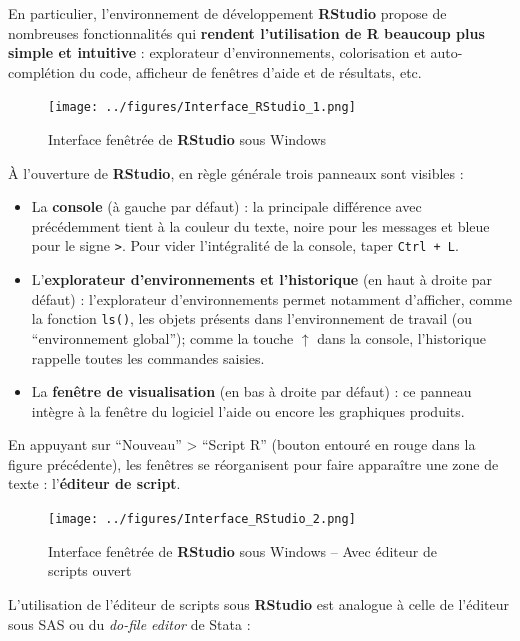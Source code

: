 \documentclass[12pt,twosided, notitlepage]{book}
\providecommand{\tightlist}{%
  \setlength{\itemsep}{0pt}\setlength{\parskip}{0pt}}
\begin{document}
En particulier, l'environnement de développement \textbf{RStudio}
propose de nombreuses fonctionnalités qui \textbf{rendent l'utilisation
de R beaucoup plus simple et intuitive} : explorateur d'environnements,
colorisation et auto-complétion du code, afficheur de fenêtres d'aide et
de résultats, etc.

\begin{figure}
\centering
\texttt{[image: ../figures/Interface\_RStudio\_1.png]}
\caption{Interface fenêtrée de \textbf{RStudio} sous Windows}
\end{figure}

À l'ouverture de \textbf{RStudio}, en règle générale trois panneaux sont
visibles :

\begin{itemize}
\tightlist
\item
  La \textbf{console} (à gauche par défaut) : la principale différence
  avec précédemment tient à la couleur du texte, noire pour les messages
  et bleue pour le signe \texttt{\textgreater{}}. Pour vider
  l'intégralité de la console, taper \texttt{Ctrl\ +\ L}.
\item
  L'\textbf{explorateur d'environnements et l'historique} (en haut à
  droite par défaut) : l'explorateur d'environnements permet notamment
  d'afficher, comme la fonction \texttt{ls()}, les objets présents dans
  l'environnement de travail (ou \enquote{environnement global}); comme
  la touche \(\uparrow\) dans la console, l'historique rappelle toutes
  les commandes saisies.
\item
  La \textbf{fenêtre de visualisation} (en bas à droite par défaut) : ce
  panneau intègre à la fenêtre du logiciel l'aide ou encore les
  graphiques produits.
\end{itemize}

En appuyant sur \enquote{Nouveau} \textgreater{} \enquote{Script R}
(bouton entouré en rouge dans la figure précédente), les fenêtres se
réorganisent pour faire apparaître une zone de texte : l'\textbf{éditeur
de script}.

\begin{figure}
\centering
\texttt{[image: ../figures/Interface\_RStudio\_2.png]}
\caption{Interface fenêtrée de \textbf{RStudio} sous Windows -- Avec
éditeur de scripts ouvert}
\end{figure}

L'utilisation de l'éditeur de scripts sous \textbf{RStudio} est analogue
à celle de l'éditeur sous SAS ou du \emph{do-file editor} de Stata :
\end{document}
